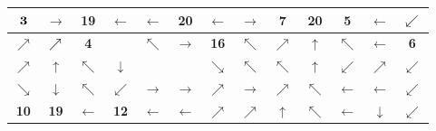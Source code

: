 \begin{center}
\begin{minipage}{\textwidth}
\renewcommand{\arraystretch}{1.3}
\begin{table}[H]
\centering 
\begin{scriptsize}
\begin{tabular}{|>{}c|>{}c|>{}c|>{}c|>{}c|>{}c|>{}c|>{}c|>{}c|>{}c|>{}c|>{}c|>{}c|}
\hline
$\bf{3}$&\cellcolor{red!15!white}$\rightarrow$&\cellcolor{red!15!white}\bf{19}&\cellcolor{red!15!white}$\leftarrow$&\cellcolor{red!15!white}$\leftarrow$&\cellcolor{blue!15!white}\bf{20}&\cellcolor{blue!15!white}$\leftarrow$&$\rightarrow$&\bf{7}&\cellcolor{red!15!white}\bf{20}&
\cellcolor{yellow!15!white}\bf{5}&\cellcolor{yellow!15!white}$\leftarrow$&$\cellcolor{red!15!white}\swarrow$\\
\hline
\cellcolor{red!15!white}$\nearrow$&$\cellcolor{red!15!white}\nearrow$&\bf{4}&\cellcolor{gray!50!white} &
\cellcolor{red!15!white}$\nwarrow$&\cellcolor{green!15!white}$\rightarrow$&\cellcolor{green!15!white}\bf{16}&\cellcolor{blue!15!white}$\nwarrow$&
\cellcolor{red!15!white}$\nearrow$&\cellcolor{red!15!white}$\uparrow$&\cellcolor{red!15!white}$\nwarrow$&\cellcolor{red!15!white}$\leftarrow$&\bf{6} \\
\hline
\cellcolor{red!15!white}$\nearrow$&\cellcolor{red!15!white}$\uparrow$&\cellcolor{red!15!white}$\nwarrow$&\cellcolor{blue!15!white}$\downarrow$&
\cellcolor{gray!50!white}&\cellcolor{gray!50!white}&\cellcolor{red!15!white}$\searrow$ &\cellcolor{green!15!white}$\nwarrow$ &\cellcolor{blue!15!white}$\nwarrow$ &\cellcolor{red!15!white}$\uparrow$&\cellcolor{blue!15!white}$\swarrow$ &$\nearrow$ &\cellcolor{blue!15!white}$\swarrow$ \\
\hline
\cellcolor{blue!15!white}$\searrow$&\cellcolor{blue!15!white}$\downarrow$&\cellcolor{red!15!white}$\nwarrow$&\cellcolor{blue!15!white}$\swarrow$&\cellcolor{green!15!white}
$\rightarrow$&\cellcolor{green!15!white}$\rightarrow$&\cellcolor{green!15!white}$\nearrow$&\cellcolor{red!15!white}$\rightarrow$&\cellcolor{red!15!white}$\nearrow$ 
&\cellcolor{blue!15!white}$\nwarrow$ &\cellcolor{blue!15!white}$\leftarrow$&\cellcolor{blue!15!white}$\leftarrow$ &\cellcolor{green!15!white}$\swarrow$ \\
\hline
\bf{10}&\cellcolor{blue!15!white}\bf{19}&\cellcolor{blue!15!white}$\leftarrow$&\cellcolor{yellow!15!white}\bf{12}&\cellcolor{yellow!15!white}
$\leftarrow$&\cellcolor{yellow!15!white}$\leftarrow$&\cellcolor{red!15!white}$\nearrow$&\cellcolor{red!15!white}$\nearrow$&\cellcolor{red!15!white}$\uparrow$ &\cellcolor{red!15!white}$\nwarrow$&\cellcolor{red!15!white}$\leftarrow$&\cellcolor{green!15!white}$\downarrow$&\cellcolor{green!15!white}$\swarrow$\\

\end{tabular}
\end{scriptsize}
\end{table}
\end{minipage}
\end{center}
